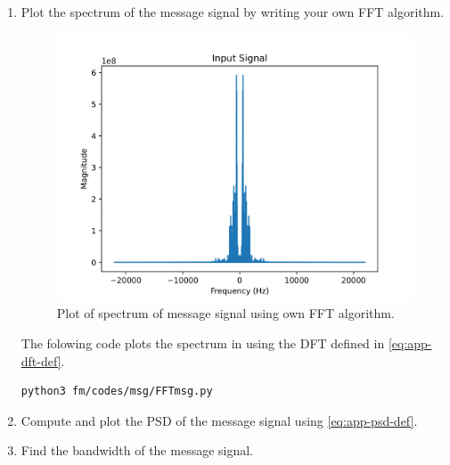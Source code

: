\begin{enumerate}[label=\arabic*.,ref=\thesection.\theenumi]
\item Plot the spectrum of the message signal by writing your own FFT algorithm.\\
	\solution
\begin{figure}[H]
\centering
\includegraphics[width=\columnwidth]{fm/msg/figs/FFTown/input2.png}
\caption{Plot of spectrum of message signal using own FFT algorithm.}
\label{fig:FFTo}
\end{figure}
The folowing code plots the spectrum in  using the DFT defined in  \eqref{eq:app-dft-def}.
\begin{lstlisting}
python3 fm/codes/msg/FFTmsg.py
\end{lstlisting}
\item Compute and plot the PSD of the message signal using 
\eqref{eq:app-psd-def}.
\item Find the bandwidth of the message signal.\\
\solution 

\end{enumerate}
